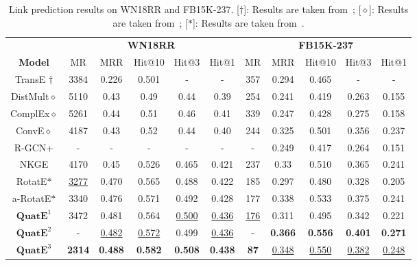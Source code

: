\documentclass{article}
\begin{document}
\begin{table}[t]
\small
\centering
\caption{Link prediction results on WN18RR and FB15K-237. [$\dagger$]: Results are taken from~\citep{nguyen2017novel}; [$\diamond$]: Results are taken from~\citep{dettmers2018convolutional}; [$\ast$]: Results are taken from~\citep{sun2019rotate}.}

\begin{tabular}{ccccccccccc}
\toprule
               & \multicolumn{5}{c}{\textbf{WN18RR}}   & \multicolumn{5}{c}{\textbf{FB15K-237}} \\
             \textbf{Model}  & MR  & MRR   & Hit@10 & Hit@3 & Hit@1 & MR & MRR   & Hit@10 & Hit@3 & Hit@1 \\ \midrule
TransE $\dagger$          &  3384  & 0.226 & 0.501  & -& -&   357& 0.294  &  0.465  & - & - \\ DistMult$\diamond$       & 5110 & 0.43 &   0.49    &  0.44    & 0.39 & 254 &  0.241& 0.419 & 0.263 & 0.155 \\
ComplEx$\diamond$        & 5261   & 0.44 &   0.51& 0.46 &0.41  & 339  &  0.247&   0.428&  0.275& 0.158 \\
ConvE$\diamond$         & 4187 &0.43  & 0.52  &  0.44& 0.40 & 244  & 0.325  & 0.501   & 0.356 & 0.237 \\
R-GCN+         & - & - & -  &-  & - & - &0.249  &0.417   & 0.264 & 0.151 \\
NKGE &  4170  & 0.45 & 0.526  & 0.465 &  0.421& 237 & 0.33  & 0.510 & 0.365 &0.241\\
RotatE$\ast$       & \underline{3277} & 0.470 & 0.565  & 0.488 & 0.422 & 185 & 0.297 &  0.480 &  0.328&  0.205\\

a-RotatE$\ast$ & 3340 & 0.476 & 0.571  & 0.492 & 0.428 & 177 & 0.338 &  0.533 &  0.375& 0.241\\

\midrule
$\textbf{QuatE}^1$ & 3472 & 0.481 & 0.564  & \underline{0.500} & \underline{0.436}  & \underline{176}  & 0.311 & 0.495  & 0.342 & 0.221 \\
$\textbf{QuatE}^2$ & - & \underline{0.482}& \underline{0.572}  & 0.499 & \underline{0.436} & - & \textbf{0.366} & \textbf{0.556} & \textbf{0.401} &\textbf{0.271 } \\

$\textbf{QuatE}^3$ & \textbf{2314} &  \textbf{ 0.488}  &   \textbf{ 0.582 } &  \textbf{ 0.508} &   \textbf{0.438}   &   \textbf{87} & \underline{ 0.348}  &   \underline{ 0.550 }&   \underline{0.382}   &    \underline{  0.248} \\ \bottomrule
\end{tabular}
\vspace{-1em}
\label{table:new}
\end{table}
\end{document}
